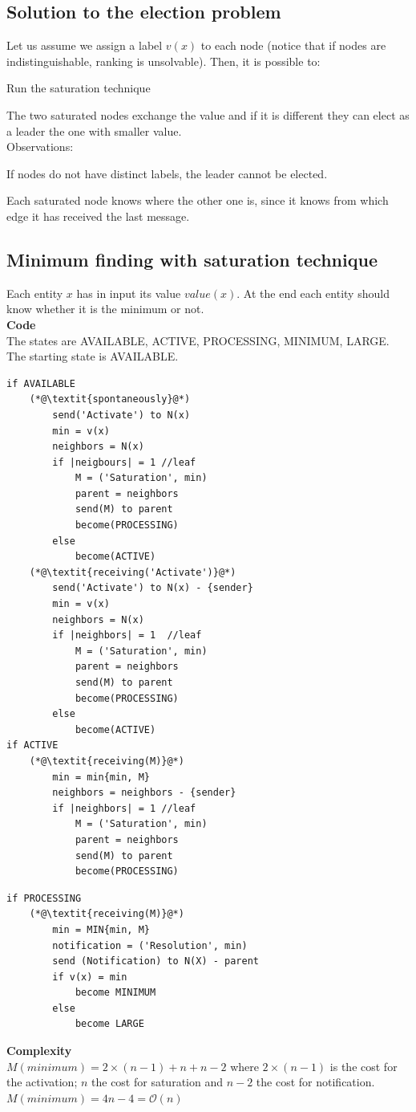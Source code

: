 \documentclass[paper=a4, fontsize=11pt]{scrartcl} %
\numberwithin{equation}{section} %
\numberwithin{figure}{section} %
\numberwithin{table}{section} %
\begin{document}
\subsection*{Solution to the election problem}
Let us assume we assign a label $v(x)$ to each node (notice that if nodes are indistinguishable, ranking is unsolvable). Then, it is possible to:
\begin{compactenum}
\item Run the saturation technique
\item The two saturated nodes exchange the value and if it is different they can elect as a leader the one with smaller value.\\
Observations:
\begin{compactitem}
	\item If nodes do not have distinct labels, the leader cannot be elected.
	\item Each saturated node knows where the other one is, since it knows from which edge it has received the last message.
\end{compactitem}
\end{compactenum}

\clearpage 
\subsection*{Minimum finding with saturation technique}
Each entity $x$ has in input its value $value(x)$. At the end each entity should know whether it is the minimum or not.\\

\textbf{Code} \\
The states are AVAILABLE, ACTIVE, PROCESSING, MINIMUM, LARGE. The starting state is AVAILABLE.
\begin{lstlisting}
if AVAILABLE
	(*@\textit{spontaneously}@*)
		send('Activate') to N(x)
		min = v(x)
		neighbors = N(x)
		if |neigbours| = 1 //leaf
			M = ('Saturation', min)
			parent = neighbors
			send(M) to parent
			become(PROCESSING)
		else
			become(ACTIVE)
	(*@\textit{receiving('Activate')}@*)
		send('Activate') to N(x) - {sender}
		min = v(x)
		neighbors = N(x)
		if |neighbors| = 1	//leaf
			M = ('Saturation', min)
			parent = neighbors
			send(M) to parent
			become(PROCESSING)
		else
			become(ACTIVE)
if ACTIVE
	(*@\textit{receiving(M)}@*)
		min = min{min, M}
		neighbors = neighbors - {sender}
		if |neighbors| = 1 //leaf
			M = ('Saturation', min)
			parent = neighbors	
			send(M) to parent
			become(PROCESSING)
\end{lstlisting}
\newpage
\begin{lstlisting}			
if PROCESSING
	(*@\textit{receiving(M)}@*)
		min = MIN{min, M}
		notification = ('Resolution', min)
		send (Notification) to N(X) - parent
		if v(x) = min
			become MINIMUM
		else
			become LARGE									
\end{lstlisting}
\textbf{Complexity} \\
$M(minimum) = 2\times(n-1) + n + n - 2$ where $2\times(n-1)$ is the cost for the activation; $n$ the cost for saturation and $n - 2$ the cost for notification.$M(minimum) = 4n - 4 = \mathcal{O}(n)$
\\ ~ \\
\end{document}
